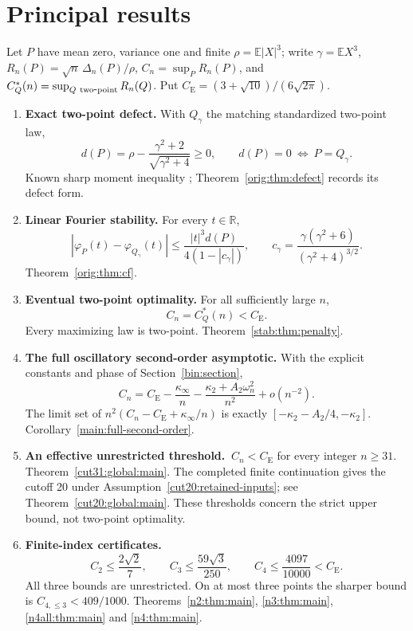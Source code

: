 \documentclass[11pt,a4paper]{article}
\numberwithin{equation}{section}
\theoremstyle{definition}
\theoremstyle{remark}
\newcommand{\E}{\mathbb E}
\newcommand{\R}{\mathbb R}
\newcommand{\CE}{C_{\mathrm E}}
\begin{document}
\section*{Principal results}
\label{main:results-at-a-glance}
Let \(P\) have mean zero, variance one and finite
\(\rho=\E|X|^3\); write \(\gamma=\E X^3\),
\(R_n(P)=\sqrt n\,\Delta_n(P)/\rho\), \(C_n=\sup_P R_n(P)\),
and \(C_Q^*(n)=\sup_{Q\ {\rm two\mbox{-}point}}R_n(Q)\).
Put \(\CE=(3+\sqrt{10})/(6\sqrt{2\pi})\).
\begin{enumerate}[leftmargin=*,label=\arabic*.,itemsep=8pt,topsep=8pt,parsep=0pt]
\item \textbf{Exact two-point defect.}
With \(Q_\gamma\) the matching standardized two-point law,
\[
 d(P)=\rho-\frac{\gamma^2+2}{\sqrt{\gamma^2+4}}\ge0,
 \qquad d(P)=0\ \Longleftrightarrow\ P=Q_\gamma.
\]
Known sharp moment inequality \cite{Shevtsova2014};
Theorem~\ref{orig:thm:defect} records its defect form.

\item \textbf{Linear Fourier stability.}
For every \(t\in\R\),
\[
 |\varphi_P(t)-\varphi_{Q_\gamma}(t)|
 \le\frac{|t|^3d(P)}{4(1-|c_\gamma|)},\qquad
 c_\gamma=\frac{\gamma(\gamma^2+6)}{(\gamma^2+4)^{3/2}}.
\]
Theorem~\ref{orig:thm:cf}.

\item \textbf{Eventual two-point optimality.}
For all sufficiently large \(n\),
\[
 C_n=C_Q^*(n)<\CE.
\]
Every maximizing law is two-point. Theorem~\ref{stab:thm:penalty}.

\item \textbf{The full oscillatory second-order asymptotic.}
With the explicit constants and phase of Section~\ref{bin:section},
\[
 C_n=\CE-\frac{\kappa_\infty}{n}
 -\frac{\kappa_2+A_2\omega_n^2}{n^2}+o(n^{-2}).
\]
The limit set of \(n^2(C_n-\CE+\kappa_\infty/n)\) is exactly
\([-\kappa_2-A_2/4,-\kappa_2]\).
Corollary~\ref{main:full-second-order}.

\item \textbf{An effective unrestricted threshold.}
\(\ C_n<\CE\) for every integer \(n\ge31\).
Theorem~\ref{cut31:global:main}.
The completed finite continuation gives the cutoff 20 under
Assumption~\ref{cut20:retained-inputs}; see
Theorem~\ref{cut20:global:main}.
These thresholds concern the strict upper bound, not two-point optimality.

\item \textbf{Finite-index certificates.}
\[
 C_2\le\frac{2\sqrt2}{7},\qquad
 C_3\le\frac{59\sqrt3}{250},\qquad
 C_4\le\frac{4097}{10000}<\CE.
\]
All three bounds are unrestricted. On at most three points the sharper
bound is \(C_{4,\le3}<409/1000\).
Theorems~\ref{n2:thm:main}, \ref{n3:thm:main},
\ref{n4all:thm:main} and \ref{n4:thm:main}.

\end{enumerate}
\endgroup
\clearpage
{\small\tableofcontents}
\clearpage
\end{document}
